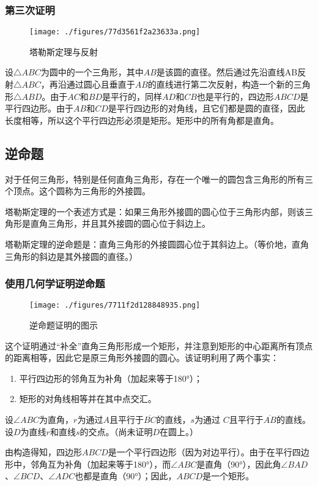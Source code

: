 \subsubsection{第三次证明}
\begin{figure}[ht]
\centering
\texttt{[image: ./figures/77d3561f2a23633a.png]}
\caption{塔勒斯定理与反射} \label{fig_Thales_5}
\end{figure}
设\(\triangle ABC\)为圆中的一个三角形，其中\(AB\)是该圆的直径。然后通过先沿直线AB反射\(\triangle ABC\)，再沿通过圆心且垂直于\(AB\)的直线进行第二次反射，构造一个新的三角形\(\triangle ABD\)。由于\(AC\)和\(BD\)是平行的，同样\(AD\)和\(CB\)也是平行的，四边形\(ABCD\)是平行四边形。由于\(AB\)和\(CD\)是平行四边形的对角线，且它们都是圆的直径，因此长度相等，所以这个平行四边形必须是矩形。矩形中的所有角都是直角。
\subsection{逆命题}  
对于任何三角形，特别是任何直角三角形，存在一个唯一的圆包含三角形的所有三个顶点。这个圆称为三角形的外接圆。

塔勒斯定理的一个表述方式是：如果三角形外接圆的圆心位于三角形内部，则该三角形是直角三角形，并且其外接圆的圆心位于斜边上。

塔勒斯定理的逆命题是：直角三角形的外接圆圆心位于其斜边上。（等价地，直角三角形的斜边是其外接圆的直径。）
\subsubsection{使用几何学证明逆命题}
\begin{figure}[ht]
\centering
\texttt{[image: ./figures/7711f2d128848935.png]}
\caption{逆命题证明的图示} \label{fig_Thales_6}
\end{figure}
这个证明通过“补全”直角三角形形成一个矩形，并注意到矩形的中心距离所有顶点的距离相等，因此它是原三角形外接圆的圆心。该证明利用了两个事实：
\begin{enumerate}
\item 平行四边形的邻角互为补角（加起来等于180°）；
\item 矩形的对角线相等并在其中点交汇。
\end{enumerate}
设\(\angle ABC\)为直角，\(r\)为通过\(A\)且平行于\(\overline{BC}\)的直线，\(s\)为通过 \(C\)且平行于\(\overline{AB}\)的直线。设\(D\)为直线\(r\)和直线\(s\)的交点。（尚未证明\(D\)在圆上。）

由构造得知，四边形\(ABCD\)是一个平行四边形（因为对边平行）。由于在平行四边形中，邻角互为补角（加起来等于180°），而\(\angle ABC\)是直角（90°），因此角\(\angle BAD\)、\(\angle BCD\)、\(\angle ADC\)也都是直角（90°）；因此，\(ABCD\)是一个矩形。


